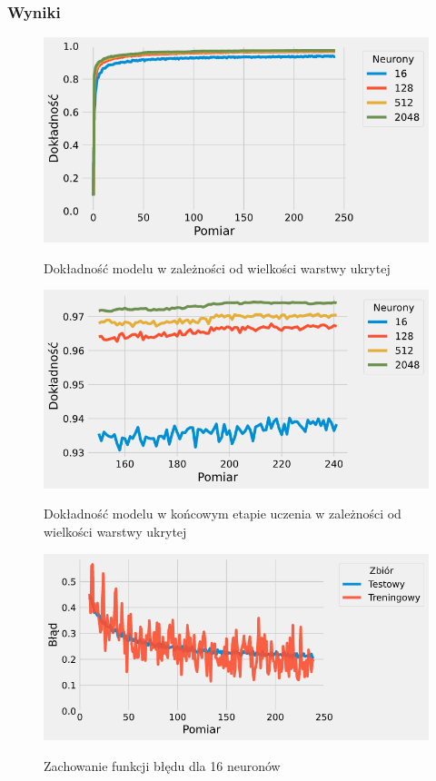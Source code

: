 \documentclass{article}
\begin{document}
\subsubsection*{Wyniki}
\begin{figure}[H]
	\centering
	\caption{Dokładność modelu w zależności od wielkości warstwy ukrytej}
	\includegraphics[width=\textwidth]{hidden_acc.png}
	\label{fig:res11}
\end{figure}
\begin{figure}[H]
	\centering
	\caption{Dokładność modelu w końcowym etapie uczenia w zależności od wielkości warstwy ukrytej}
	\includegraphics[width=\textwidth]{hidden_acc_zoom.png}
	\label{fig:res12}
\end{figure}
\begin{figure}[H]
	\centering
	\caption{Zachowanie funkcji błędu dla 16 neuronów}
	\includegraphics[width=\textwidth]{hidden_err_16.png}
	\label{fig:res13}
\end{figure}
\end{document}
